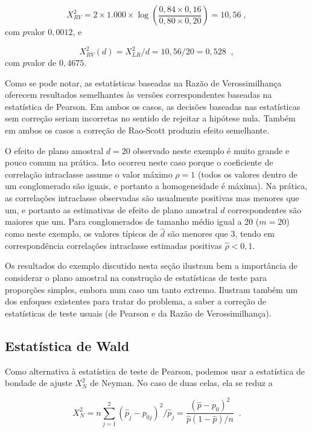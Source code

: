 \documentclass[]{book}
\theoremstyle{definition}
\theoremstyle{definition}
\theoremstyle{definition}
\theoremstyle{remark}
\begin{document}
\[
X_{RV}^{2}=2\times 1.000\times \log \left( \frac{0,84\times 0,16}{0,80\times
0,20}\right) =10,56\;, 
\] com \(p\)valor \(0,0012\), e

\[
X_{RV}^{2}(d)=X_{LR}^{2}/d=10,56/20=0,528\;\;, 
\] com \(p\)valor de \(0,4675\).

Como se pode notar, as estatísticas baseadas na Razão de Verossimilhança
oferecem resultados semelhantes às versões correspondentes baseadas na
estatística de Pearson. Em ambos os casos, as decisões baseadas nas
estatísticas sem correção seriam incorretas no sentido de rejeitar a
hipótese nula. Também em ambos os casos a correção de Rao-Scott produziu
efeito semelhante.

O efeito de plano amostral \(d=20\) observado neste exemplo é muito
grande e pouco comum na prática. Isto ocorreu neste caso porque o
coeficiente de correlação intraclasse assume o valor máximo \(\rho =1\)
(todos os valores dentro de um conglomerado são iguais, e portanto a
homogeneidade é máxima). Na prática, as correlações intraclasse
observadas são usualmente positivas mas menores que um, e portanto as
estimativas de efeito de plano amostral \(\widehat{d}\) correspondentes
são maiores que um. Para conglomerados de tamanho médio igual a \(20\)
(\(m=20\)) como neste exemplo, os valores típicos de \(\widehat{d}\) são
menores que \(3\), tendo em correspondência correlações intraclasse
estimadas positivas \(\widehat{\rho }<0,1\).

Os resultados do exemplo discutido nesta seção ilustram bem a
importância de considerar o plano amostral na construção de estatísticas
de teste para proporções simples, embora num caso um tanto extremo.
Ilustram também um dos enfoques existentes para tratar do problema, a
saber a correção de estatísticas de teste usuais (de Pearson e da Razão
de Verossimilhança).

\subsection{Estatística de Wald}\label{estatistica-de-wald}

Como alternativa à estatística de teste de Pearson, podemos usar a
estatística de bondade de ajuste \(X_{N}^{2}\) de Neyman. No caso de
duas celas, ela se reduz a

\begin{equation}
X_{N}^{2}=n\sum\limits_{j=1}^{2}\left( \hat{p}_{j}-p_{0j}\right) ^{2}/\hat{p}
_{j}=\frac{\left( \widehat{p}-p_{0}\right) ^{2}}{\hat{p}\left( 1-\hat{p}
\right) /n}\;\;\mbox{.}  
\label{eq:qual6}
\end{equation}
\end{document}
